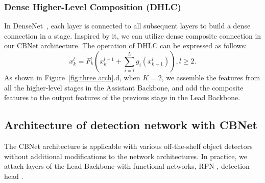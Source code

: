 \documentclass[letterpaper]{article} \usepackage{aaai20}  \usepackage{multirow}
\begin{document}
\subsubsection{Dense Higher-Level Composition (DHLC)} 
In DenseNet~\cite{huang2017densely}, each layer is connected to all subsequent layers to build a dense connection in a stage. Inspired by it, we can utilize dense composite connection in our CBNet architecture. The operation of DHLC can be expressed as follows:
\begin{equation}
x_k^l = F_k^l(x_k^{l-1} + \sum_{i=l}^L g_i(x_{k-1}^i)),  l\ge2.
\end{equation}
As shown in Figure~\ref{fig:three arch}.d, when $K=2$,
we assemble the features from all the higher-level stages in the Assistant Backbone, and add the composite features to the output features of the previous stage in the Lead Backbone.




\subsection{Architecture of detection network with CBNet }
\label{sec:det}
The CBNet architecture is applicable with various off-the-shelf object detectors without additional modifications to the network architectures.
In practice, we attach layers of the Lead Backbone with functional networks, RPN \cite{ren2015faster} , detection head \cite{Redmon_2016_CVPR,ren2015faster,zhang2018single,lin2017feature,he2017mask,cai18cascadercnn}.
\end{document}

